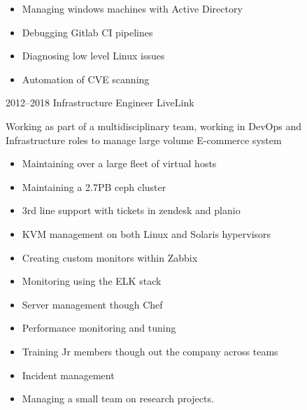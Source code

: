 \documentclass[]{friggeri-cv-a4}
\begin{document}
\begin{entrylist}
{\begin{itemize}
        \item Managing windows machines with Active Directory
        \item Debugging Gitlab CI pipelines
        \item Diagnosing low level Linux issues
        \item Automation of CVE scanning
      \end{itemize}
    }
   \entry
  	{2012--2018}
  	{Infrastructure Engineer}
  	{LiveLink}
  	{
      Working as part of a multidisciplinary team, working in DevOps and Infrastructure roles to manage large volume E-commerce system
      \begin{itemize}
        \item Maintaining over a large fleet of virtual hosts
        \item Maintaining a 2.7PB ceph cluster
        \item 3rd line support with tickets in zendesk and planio
        \item KVM management on both Linux and Solaris hypervisors
        \item Creating custom monitors within Zabbix
        \item Monitoring using the ELK stack
        \item Server management though Chef
        \item Performance monitoring and tuning
        \item Training Jr members though out the company across teams
        \item Incident management
        \item Managing a small team on research projects.
      \end{itemize}
    }
 \end{entrylist}
\end{document}
